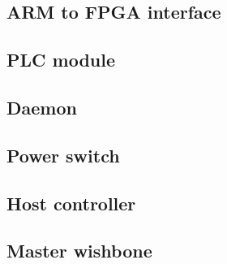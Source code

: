 \subsection{ARM to FPGA interface}



\subsection{PLC module}



\subsection{Daemon}



\subsection{Power switch}



\subsection{Host controller}



\subsection{Master wishbone}

